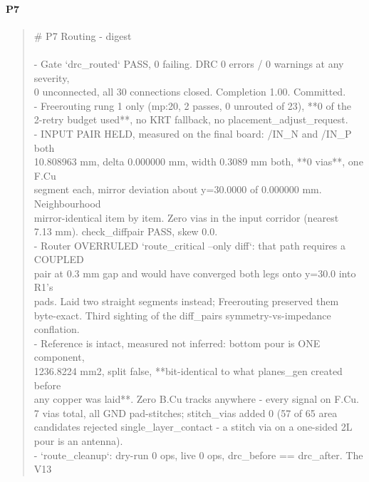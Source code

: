 \documentclass[11pt,a4paper]{article}
\begin{document}
\paragraph*{P7}
\begin{quote}\small\ttfamily\raggedright
\# P7 Routing - digest\\
~\\
- Gate `drc\_routed` PASS, 0 failing. DRC 0 errors / 0 warnings at any severity,\\
  0 unconnected, all 30 connections closed. Completion 1.00. Committed.\\
- Freerouting rung 1 only (mp:20, 2 passes, 0 unrouted of 23), {*}{*}0 of the\\
  2-retry budget used{*}{*}, no KRT fallback, no placement\_adjust\_request.\\
- INPUT PAIR HELD, measured on the final board: /IN\_N and /IN\_P both\\
  10.808963 mm, delta 0.000000 mm, width 0.3089 mm both, {*}{*}0 vias{*}{*}, one F.Cu\\
  segment each, mirror deviation about y=30.0000 of 0.000000 mm. Neighbourhood\\
  mirror-identical item by item. Zero vias in the input corridor (nearest\\
  7.13 mm). check\_diffpair PASS, skew 0.0.\\
- Router OVERRULED `route\_critical --only diff`: that path requires a COUPLED\\
  pair at 0.3 mm gap and would have converged both legs onto y=30.0 into R1's\\
  pads. Laid two straight segments instead; Freerouting preserved them\\
  byte-exact. Third sighting of the diff\_pairs symmetry-vs-impedance conflation.\\
- Reference is intact, measured not inferred: bottom pour is ONE component,\\
  1236.8224 mm2, split false, {*}{*}bit-identical to what planes\_gen created before\\
  any copper was laid{*}{*}. Zero B.Cu tracks anywhere - every signal on F.Cu.\\
  7 vias total, all GND pad-stitches; stitch\_vias added 0 (57 of 65 area\\
  candidates rejected single\_layer\_contact - a stitch via on a one-sided 2L\\
  pour is an antenna).\\
- `route\_cleanup`: dry-run 0 ops, live 0 ops, drc\_before == drc\_after. The V13\\

\end{quote}
\end{document}
